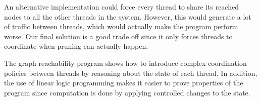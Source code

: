 An alternative implementation could force every thread to share its reached
nodes to all the other threads in the system. However, this would generate a lot
of traffic between threads, which would actually make the program perform worse.
Our final solution is a good trade off since it only forces threads to
coordinate when pruning can actually happen.

The graph reachability program shows how to introduce complex coordination
policies between threads by reasoning about the state of each thread. In
addition, the use of linear logic programming makes it easier to prove
properties of the program since computation is done by applying controlled
changes to the state.

\clearpage
